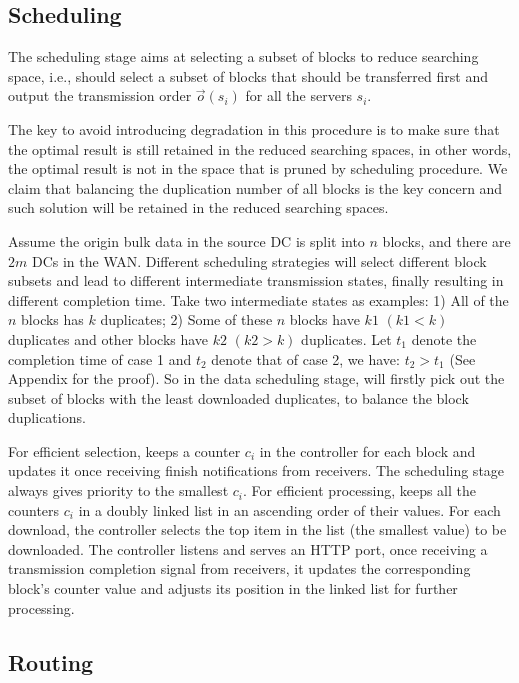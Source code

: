 \subsection{Scheduling}
\label{subsec:logic:scheduling}

The scheduling stage aims at selecting a subset of blocks to reduce searching space, i.e., \name should select a subset of blocks that should be transferred first and output the transmission order $\overrightarrow{o}(s_i)$ for all the servers $s_i$.

The key to avoid introducing degradation in this procedure is to make sure that the optimal result is still retained in the reduced searching spaces, in other words, the optimal result is not in the space that is pruned by scheduling procedure. We claim that balancing the duplication number of all blocks is the key concern and such solution will be retained in the reduced searching spaces.

Assume the origin bulk data in the source DC is split into $n$ blocks, and there are $2m$ DCs in the WAN. Different scheduling strategies will select different block subsets and lead to different intermediate transmission states, finally resulting in different completion time. Take two intermediate states as examples: 1) All of the $n$ blocks has $k$ duplicates; 2) Some of these $n$ blocks have $k1$ $(k1<k)$ duplicates and other blocks have $k2$ $(k2>k)$ duplicates. Let $t_1$ denote the completion time of case 1 and $t_2$ denote that of case 2, we have: $t_2 > t_1$ (See Appendix for the proof). So in the data scheduling stage, \name will firstly pick out the subset of blocks with the least downloaded duplicates, to balance the block duplications.

For efficient selection, \name keeps a counter $c_i$ in the controller for each block and updates it once receiving finish notifications from receivers. The scheduling stage always gives priority to the smallest $c_i$. For efficient processing, \name keeps all the counters $c_i$ in a doubly linked list in an ascending order of their values. For each download, the controller selects the top item in the list (the smallest value) to be downloaded. The controller listens and serves an HTTP port, once receiving a transmission completion signal from receivers, it updates the corresponding block's counter value and adjusts its position in the linked list for further processing.

\subsection{Routing}
\label{subsec:logic:routing}

